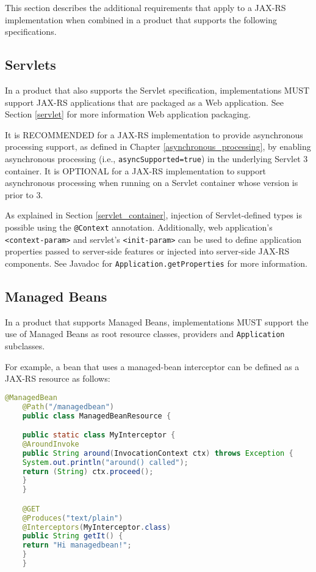 This section describes the additional requirements that apply to a JAX-RS implementation when combined in a product that
supports the following specifications.

\subsection{Servlets}
\label{servlets}

In a product that also supports the Servlet specification, implementations MUST support JAX-RS applications that are
packaged as a Web application. See Section \ref{servlet} for more information Web application packaging.

It is RECOMMENDED for a JAX-RS implementation to provide asynchronous processing support, as defined in Chapter
\ref{asynchronous_processing}, by enabling asynchronous processing (i.e., \lstinline{asyncSupported=true}) in the
underlying Servlet 3 container. It is OPTIONAL for a JAX-RS implementation to support asynchronous processing when
running on a Servlet container whose version is prior to 3.

As explained in Section \ref{servlet_container}, injection of Servlet-defined types is possible using the
\lstinline{@Context} annotation. Additionally, web application's \lstinline{<context-param>} and servlet's
\lstinline{<init-param>} can be used to define application properties passed to server-side features or injected into
server-side JAX-RS components. See Javadoc for \lstinline{Application.getProperties} for more information.

\subsection{Managed Beans}
\label{managed_beans}

In a product that supports Managed Beans, implementations MUST support the use of Managed Beans as root resource
classes, providers and \lstinline{Application} subclasses.

For example, a bean that uses a managed-bean interceptor can be defined as a JAX-RS resource as follows:

\begin{lstlisting}[language=Java]
    @ManagedBean
    @Path("/managedbean")
    public class ManagedBeanResource {

    public static class MyInterceptor {
    @AroundInvoke
    public String around(InvocationContext ctx) throws Exception {
    System.out.println("around() called");
    return (String) ctx.proceed();
    }
    }

    @GET
    @Produces("text/plain")
    @Interceptors(MyInterceptor.class)
    public String getIt() {
    return "Hi managedbean!";
    }
    }
\end{lstlisting}

